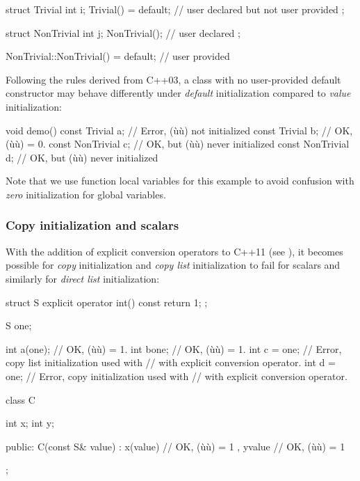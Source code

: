 \begin{emcppslisting}
struct Trivial
{
    int i;
    Trivial() = default;            // user declared but not user provided
};

struct NonTrivial
{
    int j;
    NonTrivial();                    // user declared
};

NonTrivial::NonTrivial() = default;  // user provided
\end{emcppslisting}


\noindent Following the rules derived from C++03, a class with no user-provided
default constructor may behave differently under \emph{default}
initialization compared to \emph{value} initialization:

\begin{emcppslisting}
void demo()
{
    const Trivial    a;    // Error, (ù{}ù) not initialized
    const Trivial    b{};  // OK, (ù{}ù) = 0.
    const NonTrivial c;    // OK, but (ù{}ù) never initialized
    const NonTrivial d{};  // OK, but (ù{}ù) never initialized
}
\end{emcppslisting}


\noindent Note that we use function local variables for this example to avoid
confusion with \emph{zero} initialization for global variables.

\subsubsection[Copy initialization and scalars]{Copy initialization and scalars}\label{copy-initialization-and-scalars}

With the addition of explicit conversion operators to C++11 (see ), it becomes possible for \emph{copy}
initialization and \emph{copy list} initialization to fail for scalars
and similarly for \emph{direct list} initialization:

\begin{emcppslisting}
struct S
{
    explicit operator int() const { return 1; }
};

S one{};

int a(one);     // OK, (ù{}ù) = 1.
int b{one};     // OK, (ù{}ù) = 1.
int c = {one};  // Error, copy list initialization used with
                // with explicit conversion operator.
int d = one;    // Error, copy initialization used with
                // with explicit conversion operator.

class C {
    int x;
    int y;

public:
    C(const S& value) : x(value)  // OK, (ù{}ù) = 1
                      , y{value}  // OK, (ù{}ù) = 1
    {
    }
};
\end{emcppslisting}


